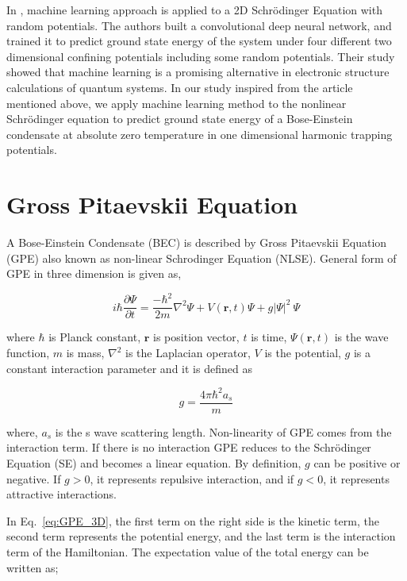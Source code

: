 \documentclass[a4paper,times,12pt]{article}
\begin{document}
In \cite{mills2017deep}, machine learning approach is applied to a 2D Schr{\"o}dinger Equation with random potentials. The authors built a convolutional deep neural network, and trained it to predict ground state energy of the system under four different two dimensional confining potentials including some random potentials. Their study showed that machine learning is a promising alternative in electronic structure calculations of quantum systems. In our study inspired from the article mentioned above, we apply machine learning method to the nonlinear Schr{\"o}dinger equation to predict ground state energy of a Bose-Einstein condensate at absolute zero temperature in one dimensional harmonic trapping potentials.


\section{Gross Pitaevskii Equation}

A Bose-Einstein Condensate (BEC) is described by Gross Pitaevskii Equation (GPE) also known as non-linear Schrodinger Equation (NLSE). General form of GPE in three dimension is given as,

\begin{equation}
\label{eq:GPE_3D}
i \hbar \frac {\partial \Psi}{\partial t} = \frac {-\hbar^2}{2m}\nabla^2
\Psi + V(\boldsymbol{r}, t)\Psi + g|\Psi|^2\ \Psi
\end{equation}

\noindent where $\hbar$ is Planck constant, $\boldsymbol{r}$ is position vector, $t$ is time, $\Psi(\boldsymbol{r}, t)$ is the wave function, $m$ is mass, $\nabla^2$ is the Laplacian operator, $V$ is the potential, $g$ is a constant interaction parameter and it is defined as 

\begin{equation}
\label{eq:GPE_inter_param}
g=\frac{4\pi\hbar^2a_s}{m}
\end{equation}

\noindent where, $a_s$ is the s wave scattering length. Non-linearity of GPE comes from the interaction term. If there is no interaction GPE reduces to the Schr{\"o}dinger Equation (SE) and becomes a linear equation. By definition, $g$ can be positive or negative. If $g > 0$, it represents repulsive interaction, and if $g < 0$, it represents attractive interactions\cite{barenghi2016primer}.

In Eq.~\eqref{eq:GPE_3D}, the first term on the right side is the kinetic term, the second term represents the potential energy, and the last term is the interaction term of the Hamiltonian. The expectation value of the total energy can be written as;
\end{document}
